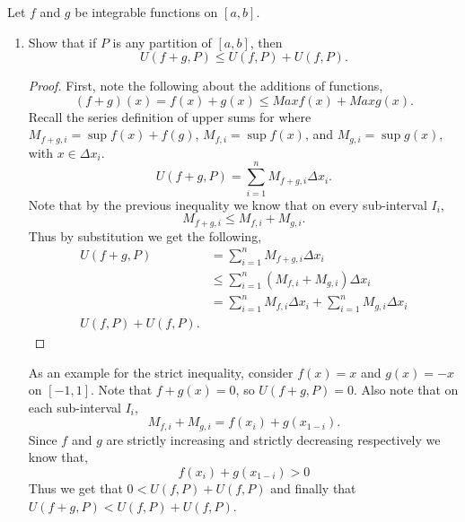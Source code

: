 \documentclass[12pt]{article}
\makeatletter
\theoremstyle{homework}
\newenvironment{exercise}[1]
{\def\@currentlabel{#1}\exercisecore}
{\endexercisecore}
\makeatother
\begin{document}
\begin{exercise}{Abbott 7.4.5} Let $f$ and $g$ be integrable functions on $[a,b]$.\\
	\begin{enumerate}
		\item Show that if $P$ is any partition of $[a,b]$, then
		\begin{equation*}
			U(f+g,P) \le U(f,P) + U(f,P).
		\end{equation*}
		\begin{proof}

		First, note the following about the additions of functions,
		\begin{equation*}
			(f+g)(x) = f(x) + g(x) \le Max f(x)  +  Max g(x).
		\end{equation*}
		Recall the series definition of upper sums for where $M_{f+g,i} = \sup f(x) + f(g)$, $M_{f,i} = \sup f(x)$, and $M_{g,i} = \sup g(x)$, with $x \in \Delta x_i$.
		\begin{equation*}
			U(f+g,P) = \sum_{i = 1}^n M_{f+g,i}\Delta x_i.
		\end{equation*} 
		Note that by the previous inequality we know that on every sub-interval $I_i$,
		\begin{equation*}
			M_{f+g,i} \le M_{f,i} + M_{g,i}.
		\end{equation*}
		Thus by substitution we get the following,
		\begin{align*}
			U(f+g,P) &= \sum_{i = 1}^n M_{f+g,i}\Delta x_i\\
			&\le  \sum_{i = 1}^n (M_{f,i} + M_{g,i})\Delta x_i\\
			&= \sum_{i = 1}^n M_{f,i}\Delta x_i + \sum_{i = 1}^n M_{g,i}\Delta x_i\\
			U(f,P) + U(f,P).
		\end{align*}
					
	\end{proof}

	As an example for the strict inequality, consider $f(x) = x$ and $g(x) = -x$ on $[-1,1]$. Note that $f+g(x) = 0$, so $U(f+g,P) = 0$.
	Also note that on each sub-interval $I_i$,
	\begin{equation*}
		M_{f,i} + M_{g,i} = f(x_i) + g(x_{1-i}).
	\end{equation*}
	Since $f$ and $g$ are strictly increasing and strictly decreasing respectively we know that,
	\begin{equation*}
	f(x_i) + g(x_{1-i})>0
	\end{equation*}
	Thus we get that $0< U(f,P) + U(f,P)$ and finally that $U(f+g,P) < U(f,P) + U(f,P)$.
	\vspace{.25in}



\end{enumerate}
\end{exercise}
\end{document}
